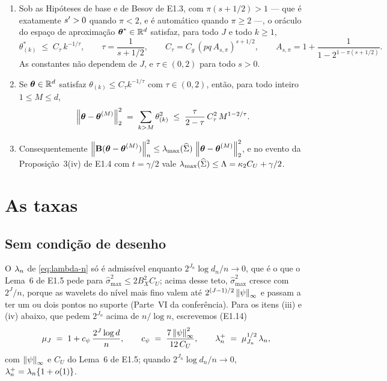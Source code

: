 \documentclass[11pt,a4paper]{article}
\newcommand{\lmaxx}{\lambda_{\max}}
\newcommand{\Bmat}{\mathbf{B}}
\newcommand{\smax}{\widehat{\sigma}_{\max}}
\begin{document}
\begin{lemma}
\label{lem:weak}
\begin{enumerate}[label=\textup{(\roman*)}, leftmargin=*]
  \item Sob as Hipóteses de base e de Besov de E1.3, com
    $\pi(s + 1/2) > 1$ --- que é exatamente $s' > 0$ quando $\pi < 2$, e é
    automático quando $\pi \ge 2$ ---, o oráculo do espaço de aproximação
    $\boldsymbol{\theta}^{*} \in \mathbb{R}^{d}$ satisfaz, para todo $J$ e todo $k \ge 1$,
    \begin{equation}
      \label{eq:weak}
      \theta^{*}_{(k)} \;\le\; C_{\tau}\,k^{-1/\tau},
      \qquad
      \tau = \frac{1}{s + 1/2},
      \qquad
      C_{\tau} = C_{g}\,(pq\,A_{s,\pi})^{s+1/2},
      \qquad
      A_{s,\pi} = 1 + \frac{1}{1 - 2^{1-\pi(s+1/2)}} .
    \end{equation}
    As constantes não dependem de $J$, e $\tau \in (0,2)$ para todo $s > 0$.
  \item Se $\boldsymbol{\theta} \in \mathbb{R}^{d}$ satisfaz $\theta_{(k)} \le C_{\tau}k^{-1/\tau}$
    com $\tau \in (0,2)$, então, para todo inteiro $1 \le M \le d$,
    \[
      \left\lVert \boldsymbol{\theta} - \boldsymbol{\theta}^{(M)} \right\rVert_{2}^{2}
      \;=\; \sum_{k > M}\theta_{(k)}^{2}
      \;\le\; \frac{\tau}{2-\tau}\,C_{\tau}^{2}\,M^{1 - 2/\tau}.
    \]
  \item Consequentemente
    $\normn{\Bmat(\btheta - \btheta^{(M)})}^{2} \le \lmaxx(\Gramhat)\,
    \norm{\btheta-\btheta^{(M)}}_{2}^{2}$, e no evento da
    Proposição~3(iv) de E1.4 com $t = \gamma/2$ vale
    $\lmaxx(\Gramhat) \le \Lambda = \kappa_{2}C_{U} + \gamma/2$.
\end{enumerate}
\end{lemma}

\section{As taxas}

\subsection*{Sem condição de desenho}

O $\lambda_{n}$ de \eqref{eq:lambda-n} só é admissível enquanto
$2^{J_{n}}\log d_{n}/n \to 0$, que é o que o Lema~6 de E1.5 pede para
$\smax^{2} \le 2B_{X}^{2}C_{U}$; acima desse teto, $\smax^{2}$ cresce com
$2^{J}/n$, porque as wavelets do nível mais fino valem até
$2^{(J-1)/2}\left\lVert \psi \right\rVert_{\infty}$ e passam a ter um ou dois pontos no suporte
(Parte~VI da conferência). Para os itens (iii) e (iv) abaixo, que pedem $2^{J_{n}}$ acima de
$n/\log n$, escrevemos (E1.14)
\begin{equation}
  \label{eq:mu}
  \mu_{J} \;=\; 1 + c_{\psi}\,\frac{2^{J}\log d}{n},
  \qquad
  c_{\psi} \;=\; \frac{7\left\lVert \psi \right\rVert_{\infty}^{2}}{12\,C_{U}},
  \qquad
  \lambda_{n}^{+} \;=\; \mu_{J_{n}}^{1/2}\,\lambda_{n},
\end{equation}
com $\left\lVert \psi \right\rVert_{\infty}$ e $C_{U}$ do Lema~6 de E1.5; quando
$2^{J_{n}}\log d_{n}/n \to 0$, $\lambda_{n}^{+} = \lambda_{n}\{1 + o(1)\}$.
\end{document}
